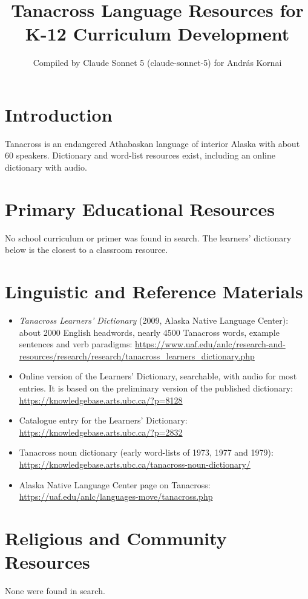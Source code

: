 \documentclass[12pt]{article}
\title{Tanacross Language Resources for K-12 Curriculum Development}
\author{Compiled by Claude Sonnet 5 (claude-sonnet-5) for Andr\'as Kornai}
\date{}
\begin{document}
\maketitle

\section{Introduction}
Tanacross is an endangered Athabaskan language of interior Alaska with about 60 speakers. Dictionary and word-list resources exist, including an online dictionary with audio.

\section{Primary Educational Resources}
No school curriculum or primer was found in search. The learners' dictionary below is the closest to a classroom resource.

\section{Linguistic and Reference Materials}
\begin{itemize}
\item \emph{Tanacross Learners' Dictionary} (2009, Alaska Native Language Center): about 2000 English headwords, nearly 4500 Tanacross words, example sentences and verb paradigms: \url{https://www.uaf.edu/anlc/research-and-resources/research/research/tanacross_learners_dictionary.php}
\item Online version of the Learners' Dictionary, searchable, with audio for most entries. It is based on the preliminary version of the published dictionary: \url{https://knowledgebase.arts.ubc.ca/?p=8128}
\item Catalogue entry for the Learners' Dictionary: \url{https://knowledgebase.arts.ubc.ca/?p=2832}
\item Tanacross noun dictionary (early word-lists of 1973, 1977 and 1979): \url{https://knowledgebase.arts.ubc.ca/tanacross-noun-dictionary/}
\item Alaska Native Language Center page on Tanacross: \url{https://uaf.edu/anlc/languages-move/tanacross.php}
\end{itemize}

\section{Religious and Community Resources}
None were found in search.
\end{document}
